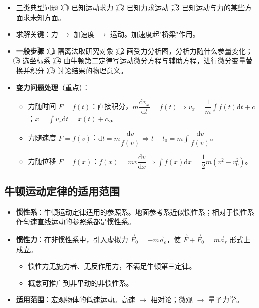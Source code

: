 \documentclass[12pt,a4paper]{ctexart}
\begin{document}
\begin{itemize}
    \item 三类典型问题：\textcircled{1} 已知运动求力；\textcircled{2} 已知力求运动；\textcircled{3} 已知运动与力的某些方面求未知方面。
    \item 求解关键：力 $\to$ 加速度 $\to$ 运动。加速度起"桥梁"作用。
    \item \textbf{一般步骤}：\textcircled{1} 隔离法取研究对象；\textcircled{2} 画受力分析图，分析力随什么参量变化；\textcircled{3} 选坐标系；\textcircled{4} 由牛顿第二定律写运动微分方程与辅助方程，进行微分变量替换并积分；\textcircled{5} 讨论结果的物理意义。
    \item \textbf{变力问题处理}（重点）：
    \begin{itemize}
        \item 力随时间 $F=f(t)$：直接积分，$m\dfrac{\mathrm{d}v_x}{\mathrm{d}t} = f(t) \Rightarrow v_x = \dfrac{1}{m}\displaystyle\int f(t)\mathrm{d}t + c$；$x = \displaystyle\int v_x \mathrm{d}t = x(t) + c_2$。
        \item 力随速度 $F=f(v)$：$\mathrm{d}t = m\dfrac{\mathrm{d}v}{f(v)} \Rightarrow t - t_0 = m\displaystyle\int \dfrac{\mathrm{d}v}{f(v)}$。
        \item 力随位移 $F=f(x)$：$f(x) = m v \dfrac{\mathrm{d}v}{\mathrm{d}x} \Rightarrow \displaystyle\int f(x)\mathrm{d}x = \dfrac{1}{2}m(v^2 - v_0^2)$。
    \end{itemize}
\end{itemize}

\subsection{牛顿运动定律的适用范围}

\begin{itemize}
    \item \textbf{惯性系}：牛顿运动定律适用的参照系。地面参考系近似惯性系；相对于惯性系作匀速直线运动的参照系都是惯性系。
    \item \textbf{惯性力}：在非惯性系中，引入虚拟力 $\vec{F}_0 = -m\vec{a}_e$，使 $\vec{F} + \vec{F}_0 = m\vec{a}_r$ 形式上成立。
    \begin{itemize}
        \item 惯性力无施力者、无反作用力，不满足牛顿第三定律。
        \item 概念可推广到非平动的非惯性系。
    \end{itemize}
    \item \textbf{适用范围}：宏观物体的低速运动。高速 $\to$ 相对论；微观 $\to$ 量子力学。
\end{itemize}
\end{document}
